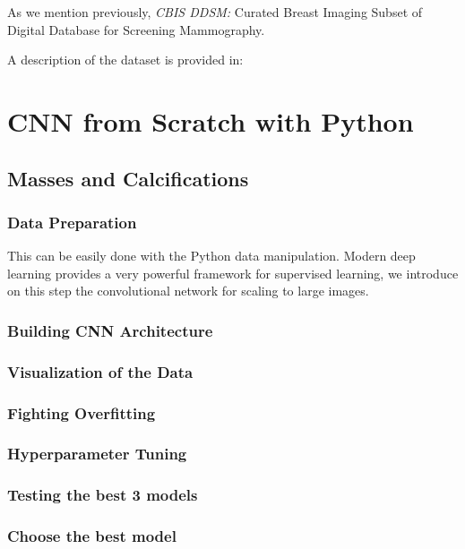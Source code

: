 \documentclass{book}
\begin{document}
    
    As we mention previously,  \textit{CBIS DDSM:} Curated Breast Imaging Subset of Digital Database for Screening Mammography.

    A description of the dataset is provided in:


    \chapter{CNN from Scratch with Python}
    
        \section{Masses and Calcifications} %

            \subsection{Data Preparation}

            This can be easily done with the Python data manipulation. Modern deep learning provides a very powerful framework for supervised learning, we introduce on this step the convolutional network for scaling to large images.

            \subsection{Building CNN Architecture}
            \subsection{Visualization of the Data}
            \subsection{Fighting Overfitting}
            \subsection{Hyperparameter Tuning}
            \subsection{Testing the best 3 models}
            \subsection{Choose the best model}
\end{document}
